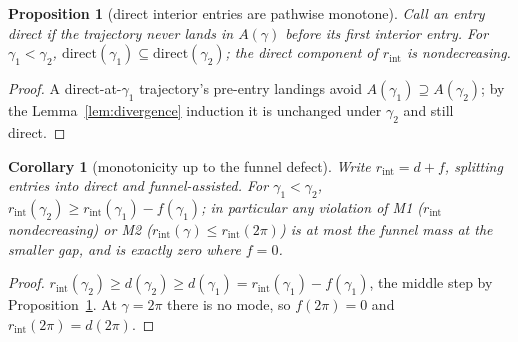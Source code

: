\documentclass[11pt]{article}
\newtheorem{proposition}{Proposition}
\newtheorem{corollary}{Corollary}
\theoremstyle{remark}
\begin{document}
\begin{proposition}[direct interior entries are pathwise monotone]
\label{prop:direct}
Call an entry \emph{direct} if the trajectory never lands in $A(\gamma)$
before its first interior entry. For $\gamma_1 < \gamma_2$,
$\mathrm{direct}(\gamma_1) \subseteq \mathrm{direct}(\gamma_2)$; the
direct component of $r_{\mathrm{int}}$ is nondecreasing.
\end{proposition}
\begin{proof}
A direct-at-$\gamma_1$ trajectory's pre-entry landings avoid
$A(\gamma_1) \supseteq A(\gamma_2)$; by the
Lemma~\ref{lem:divergence} induction it is unchanged under $\gamma_2$ and
still direct.
\end{proof}

\begin{corollary}[monotonicity up to the funnel defect]
\label{cor:funneldefect}
Write $r_{\mathrm{int}} = d + f$, splitting entries into direct and
funnel-assisted. For $\gamma_1 < \gamma_2$,
$r_{\mathrm{int}}(\gamma_2) \ge r_{\mathrm{int}}(\gamma_1) -
f(\gamma_1)$; in particular any violation of M1
($r_{\mathrm{int}}$ nondecreasing) or M2
($r_{\mathrm{int}}(\gamma) \le r_{\mathrm{int}}(2\pi)$) is at most the
funnel mass at the smaller gap, and is exactly zero where $f = 0$.
\end{corollary}
\begin{proof}
$r_{\mathrm{int}}(\gamma_2) \ge d(\gamma_2) \ge d(\gamma_1) =
r_{\mathrm{int}}(\gamma_1) - f(\gamma_1)$, the middle step by
Proposition~\ref{prop:direct}. At $\gamma = 2\pi$ there is no mode, so
$f(2\pi) = 0$ and $r_{\mathrm{int}}(2\pi) = d(2\pi)$.
\end{proof}
\end{document}
